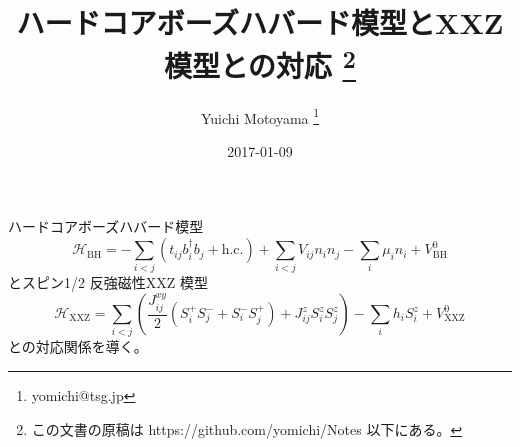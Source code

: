 \documentclass{jsarticle}
\title{ハードコアボーズハバード模型とXXZ 模型との対応 \thanks{この文書の原稿は https://github.com/yomichi/Notes 以下にある。}}
\author{Yuichi Motoyama \thanks{yomichi@tsg.jp}}
\date{2017-01-09}
\begin{document}
\maketitle

ハードコアボーズハバード模型
\begin{equation}
  \mathcal{H}_\text{BH}
  =
  - \sum_{i<j}\left( t_{ij} b_i^\dagger b_j + \text{h.c.}\right)
  + \sum_{i<j}V_{ij} n_i n_j
  - \sum_i \mu_i n_i
  + V_\text{BH}^0
\end{equation}
とスピン1/2 反強磁性XXZ 模型
\begin{equation}
  \mathcal{H}_\text{XXZ}
  =
  \sum_{i<j}\left( \frac{J_{ij}^{xy}}{2} \left(S_i^+S_j^- + S_i^-S_j^+\right) + J_{ij}^z S_i^zS_j^z \right)
  - \sum_i h_i S_i^z
  + V_\text{XXZ}^0
\end{equation}
との対応関係を導く。
\end{document}
